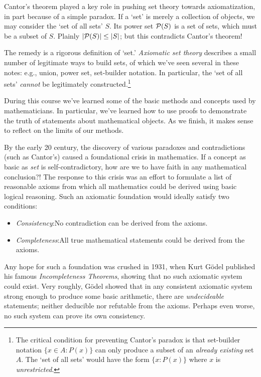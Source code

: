 Cantor's theorem played a key role in pushing set theory towards axiomatization, in part because of a simple paradox. If a `set' is merely a collection of objects, we may consider the `set of all sets' $S$. Its power set $\mathcal{P}(S)$ is a set of sets, which must be a subset of $S$. Plainly $\left| \mathcal{P}(S)\right|\le\left| S\right|$; but this contradicts Cantor's theorem!\smallbreak

The remedy is a rigorous definition of `set.' \emph{Axiomatic set theory} describes a small number of legitimate ways to build sets, of which we've seen several in these notes: e.g., union, power set, set-builder notation. In particular, the `set of all sets' \emph{cannot} be legitimately constructed.\footnote{%
	The critical condition for preventing Cantor's paradox is that set-builder notation $\{x\in A:P(x)\}$ can only produce a subset of an \emph{already existing} set $A$. The `set of all sets' would have the form $\{x:P(x)\}$ where $x$ is \emph{unrestricted}.%
}  




During this course we've learned some of the basic methods and concepts used by mathematicians. In particular, we've learned how to use proofs to demonstrate the truth of statements about mathematical objects. As we finish, it makes sense to reflect on the limits of our methods.\smallbreak

By the early 20\th{} century, the discovery of various paradoxes and contradictions (such as  Cantor's) caused a foundational crisis in mathematics. If a concept as basic as \emph{set} is self-contradictory, how are we to have faith in any mathematical conclusion?! The response to this crisis was an effort to formulate a list of reasonable axioms from which all mathematics could be derived using basic logical reasoning. Such an axiomatic foundation would ideally satisfy two conditions:
\begin{itemize}\itemsep0pt
  \item \emph{Consistency}:\lstsp No contradiction can be derived from the axioms.
  \item \emph{Completeness}:\lstsp All true mathematical statements could be derived from the axioms.
\end{itemize}
Any hope for such a foundation was crushed in 1931, when Kurt Gödel published his famous \emph{Incompleteness Theorems}, showing that no such axiomatic system could exist. Very roughly, Gödel showed that in any consistent axiomatic system strong enough to produce some basic arithmetic, there are \emph{undecideable} statements; neither deducible nor refutable from the axioms. Perhaps even worse, no such system can prove its own consistency.\smallbreak

